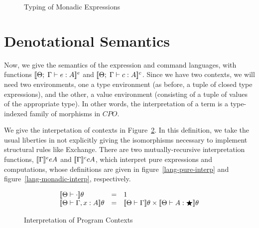 \begin{figure}
\caption{Typing of Monadic Expressions}
\label{lang-typing-monadic}
\end{figure}

\section{Denotational Semantics}

Now, we give the semantics of the expression and command languages,
with functions $[\![{{\Theta};\;{\Gamma} \vdash {e} : {A}}]\!]^e$ and
$[\![{{\Theta};\;{\Gamma} \vdash {c} : {A}}]\!]^c$. Since we have two contexts, we will
need two environments, one a type environment (as before, a tuple of
closed type expressions), and the other, a value environment
(consisting of a tuple of values of the appropriate type). In other
words, the interpretation of a term is a type-indexed family of
morphisms in $CPO$.

We give the interpetation of contexts in
Figure~\ref{lang-context-interp}. In this definition, we take the
usual liberties in not explicitly giving the isomorphisms necessary to
implement structural rules like Exchange. There are two
mutually-recursive interpretation functions, $[\![{\Gamma}]\!]^e{e}{A}$
and $[\![{\Gamma}]\!]^c{c}{A}$, which interpret pure expressions and
computations, whose definitions are given in
figure~\ref{lang-pure-interp} and figure~\ref{lang-monadic-interp},
respectively.

\begin{figure}
\begin{displaymath}
  \begin{array}{lcl}
  \interp{\Theta \vdash \cdot}\theta & = & 1 \\
  \interp{\Theta \vdash \Gamma, x:A}\theta & = & 
       \interp{\Theta \vdash \Gamma}\theta 
       \times 
       \interp{\Theta \vdash A:\bigstar}\theta \\
  \end{array}
\end{displaymath}
\caption{Interpretation of Program Contexts}
\label{lang-context-interp}
\end{figure}

